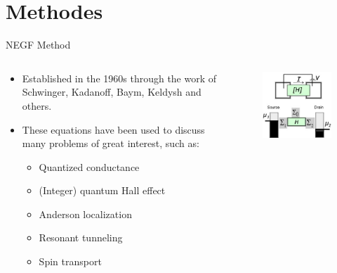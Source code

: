 \documentclass[handout,t]{beamer}
\begin{document}
\section{Methodes}
\begin{frame}{NEGF Method}
	\begin{columns}
		\begin{column}[t]{0.5\linewidth}
			\begin{itemize}
				\item Established in the 1960s through the work of Schwinger, Kadanoff, Baym, Keldysh and others.
				\item These equations have been used to discuss many problems of great interest, such as:\begin{itemize}
					\item Quantized conductance
					\item (Integer) quantum Hall effect
					\item Anderson localization
					\item Resonant tunneling
					\item Spin transport
				\end{itemize}
			\end{itemize}
		\end{column}
		\begin{column}[t]{0.5\linewidth}
			\begin{figure}
				\centering
				\includegraphics[width=\linewidth]{../figures/NEGF-model.png}
				\label{fig:NEGF-model}
			\end{figure}
		\end{column}
	\end{columns}
\end{frame}
\end{document}
